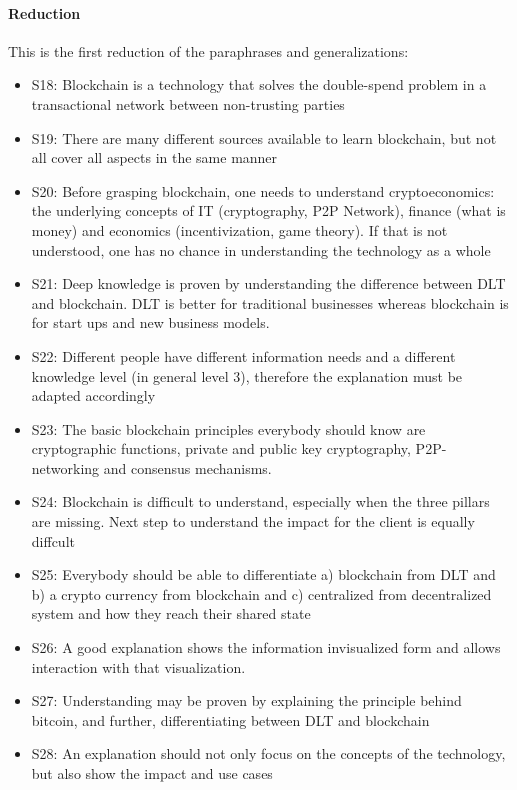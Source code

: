 \paragraph{Reduction} This is the first reduction of the paraphrases and generalizations: 
\begin{itemize}
    \item S18: Blockchain is a technology that solves the double-spend problem in a transactional network between non-trusting parties 
    \item S19: There are many different sources available to learn blockchain, but not all cover all aspects in the same manner 
    \item S20: Before grasping blockchain, one needs to understand cryptoeconomics: the underlying concepts of IT (cryptography, P2P Network), finance (what is money) and economics (incentivization, game theory). If that is not understood, one has no chance in understanding the technology as a whole 
    \item S21: Deep knowledge is proven by understanding the difference between DLT and blockchain. DLT is better for traditional businesses whereas blockchain is for start ups and new business models.
    \item S22: Different people have different information needs and a different knowledge level (in general level 3), therefore the explanation must be adapted accordingly
    \item S23: The basic blockchain principles everybody should know are cryptographic functions, private and public key cryptography, P2P-networking and consensus mechanisms.
    \item S24: Blockchain is difficult to understand, especially when the three pillars are missing. Next step to understand the impact for the client is equally diffcult
    \item S25: Everybody should be able to differentiate a) blockchain from DLT and b) a crypto currency from blockchain and c) centralized from decentralized system and how they reach their shared state 
    \item S26: A good explanation shows the information invisualized form and allows interaction with that visualization.
    \item S27: Understanding may be proven by explaining the principle behind bitcoin, and further, differentiating between DLT and blockchain
    \item S28: An explanation should not only focus on the concepts of the technology, but also show the impact and use cases 
\end{itemize}

